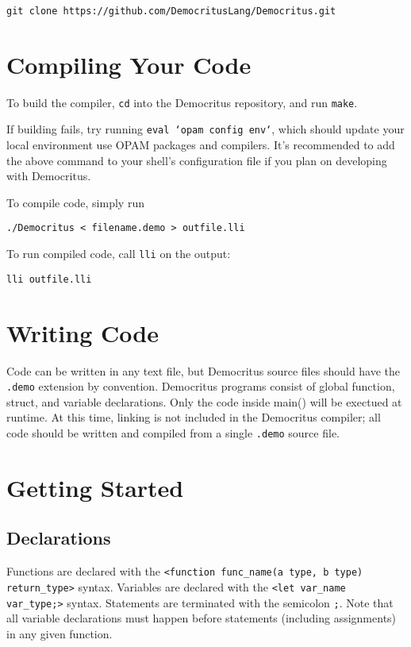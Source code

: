 	\begin{lstlisting}
git clone https://github.com/DemocritusLang/Democritus.git
	\end{lstlisting}


\section{Compiling Your Code}
	
	To build the compiler, \texttt{cd} into the Democritus repository, and run \texttt{make}.

	\medskip \noindent
	If building fails, try running \texttt{eval `opam config env`}, which should update your local environment use OPAM packages and compilers. It's recommended to add the above command to your shell's configuration file if you plan on developing with Democritus.

	\medskip \noindent
	To compile code, simply run
	\begin{lstlisting}
./Democritus < filename.demo > outfile.lli
	\end{lstlisting}

	\noindent To run compiled code, call \texttt{lli} on the output:
	\begin{lstlisting}
lli outfile.lli
	\end{lstlisting}

\section{Writing Code}

	Code can be written in any text file, but Democritus source files should have the \texttt{.demo} extension by convention. Democritus programs consist of global function, struct, and variable declarations. Only the code inside main() will be exectued at runtime. At this time, linking is not included in the Democritus compiler; all code should be written and compiled from a single \texttt{.demo} source file.

\section{Getting Started}

	\subsection{Declarations}
	Functions are declared with the \texttt{<function func\_name(a type, b type) return\_type>} syntax. Variables are declared with the \texttt{<let var\_name var\_type;>} syntax. Statements are terminated with the semicolon \texttt{;}. Note that all variable declarations must happen before statements (including assignments) in any given function.

